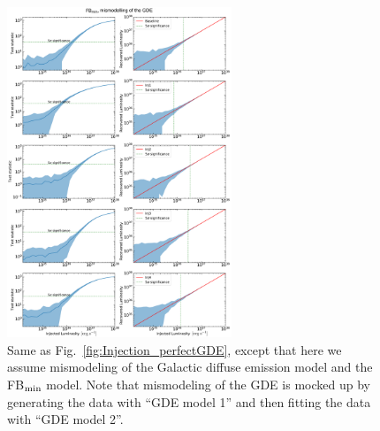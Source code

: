 \documentclass[doublespace,nopageskip]{VTthesis} %
\begin{document}
\begin{figure}
    \begin{center}
    \includegraphics[width=0.6\textwidth]{Figures/CTA/all-TS-mis-True-Fermi-min-True.pdf}
    \caption{Same as Fig.~\ref{fig:Injection_perfectGDE}, except that here we assume mismodeling of the Galactic diffuse emission model and the FB$_{\rm min}$ model. Note that mismodeling of the GDE is mocked up by generating the data with ``GDE model 1'' and then fitting the data with ``GDE model 2''. }\label{fig:InjectionmismodelingFBmin}
    \end{center}
\end{figure}
\end{document}

